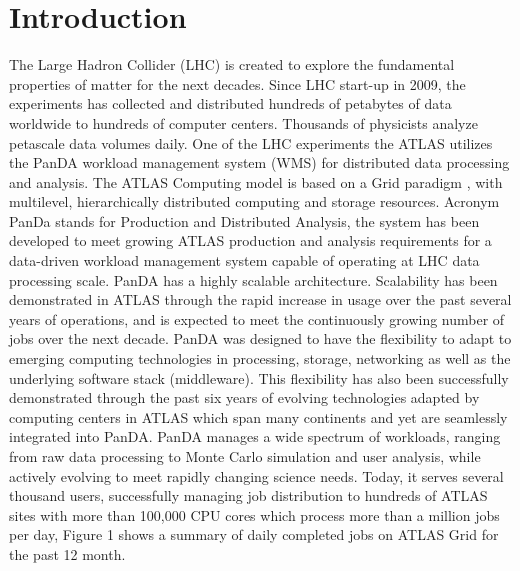 \documentclass[10pt, conference, compsocconf]{IEEEtran}
\begin{document}
\section{Introduction}\label{sec:intro}
The Large Hadron Collider (LHC) is created  to explore the fundamental  properties  of matter for the next decades. Since LHC start-up in 2009, the experiments has collected and distributed hundreds  of  petabytes  of  data worldwide to hundreds of computer centers. Thousands of physicists analyze petascale  data volumes daily. One of  the LHC experiments  the ATLAS  \cite{Aad:2008}  utilizes the PanDA  workload management system \cite{Maeno2011} (WMS) for distributed data processing and analysis. The ATLAS Computing model \cite{Atlas2005} is based on a Grid paradigm \cite{Foster:1998}, with multilevel, hierarchically distributed computing  and storage resources. Acronym  PanDa stands for Production  and Distributed Analysis, the system  has  been developed to meet growing ATLAS production and analysis requirements for a data-driven  workload  management system capable of operating at LHC data processing scale.
PanDA has a highly scalable architecture. Scalability  has been demonstrated in ATLAS through the rapid increase in usage over the past several years of operations, and is expected to meet the continuously growing number of jobs over the next decade. PanDA  was designed to have the flexibility to adapt to emerging computing  technologies in processing,  storage, networking  as well as the underlying software stack (middleware). This flexibility has also been successfully demonstrated through the past six years of evolving  technologies adapted by computing centers in ATLAS which span many continents and yet are seamlessly integrated into PanDA.
PanDA  manages a wide spectrum of workloads, ranging from raw data processing to Monte Carlo simulation and user analysis, while actively evolving to meet rapidly changing science needs.  Today, it  serves several  thousand users, successfully managing job distribution to hundreds of ATLAS sites with more than 100,000 CPU cores  which process  more than a million jobs per day, Figure 1 shows  a  summary   of daily completed jobs on ATLAS Grid for the past 12 month.
\end{document}
